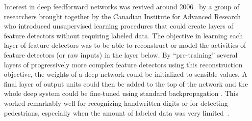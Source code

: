 \documentclass[10pts]{article}
\begin{document}

Interest in deep feedforward networks was revived around
2006~\citep{IJCAI,Hinton06-small,Bengio-nips-2006-small,ranzato-07-small}
by a group of researchers brought together by the Canadian Institute
for Advanced Research who introduced
unsupervised learning procedures that could
create layers of feature detectors without requiring labeled data. The
objective in learning each layer of feature detectors was to be able
to reconstruct or model the activities of feature detectors (or raw
inputs) in the layer below.  By ``pre-training'' several layers of
progressively more complex feature detectors using this reconstruction
objective, the weights of a deep network could be initialized to
sensible values.  A final layer of output units could then be added to
the top of the network and the whole deep system could be fine-tuned
using standard backpropagation
\citep{Hinton-Science2006,Bengio-nips-2006-small,ranzato-07-small}.
This worked remarkably well for recognizing handwritten digits or for
detecting pedestrians, especially when the amount of labeled data was
very limited~\citep{sermanet-cvpr-13}.

\end{document}
